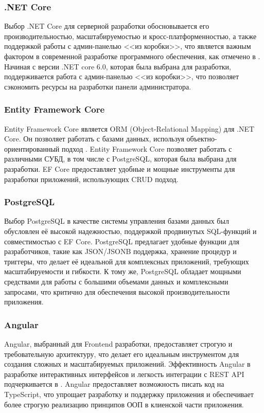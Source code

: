 \subsubsection{.NET Core}
Выбор .NET Core для серверной разработки обосновывается его производительностью, масштабируемостью и кросс-платформенностью, а также поддержкой работы с админ-панелью <<из коробки>>, что является важным фактором в современной разработке программного обеспечения, как отмечено в \cite{mark_price}.
Начиная с версии .NET core 6.0, которая была выбрана для разработки, поддерживается работа с админ-панелью <<из коробки>>, что позволяет сэкономить ресурсы на разработки панели администратора.

\subsubsection{Entity Framework Core}
Entity Framework Core является ORM (Object-Relational Mapping) для .NET Core. Он позволяет работать с базами данных, используя объектно-ориентированный подход \cite{grinchenko}. Entity Framework Core позволяет работать с различными СУБД, в том числе с PostgreSQL, которая была выбрана для разработки. EF Core предоставляет удобные и мощные инструменты для разработки приложений, использующих CRUD подход.

\subsubsection{PostgreSQL}
Выбор PostgreSQL в качестве системы управления базами данных был обусловлен её высокой надежностью, поддержкой продвинутых SQL-функций и совместимостью с EF Core. PostgreSQL предлагает удобные функции для разработчиков, такие как JSON/JSONB поддержка, хранение процедур и триггеры, что делает её идеальной для комплексных приложений, требующих масштабируемости и гибкости. К тому же, PostgreSQL обладает мощными средствами для работы с большими объемами данных и комплексными запросами, что критично для обеспечения высокой производительности приложения.

\subsubsection{Angular}
Angular, выбранный для Frontend разработки, предоставляет строгую и требовательную архитектуру, что делает его идеальным инструментом для создания сложных и масштабируемых приложений. Эффективность Angular в разработке интерактивных интерфейсов и легкость интеграции с REST API подчеркивается в \cite{cssspecs}. Angular предоставляет возможность писать код на TypeScript, что упрощает разработку и поддержку приложения и обеспечивает более строгую реализацию принципов ООП в клиенской части приложения.

